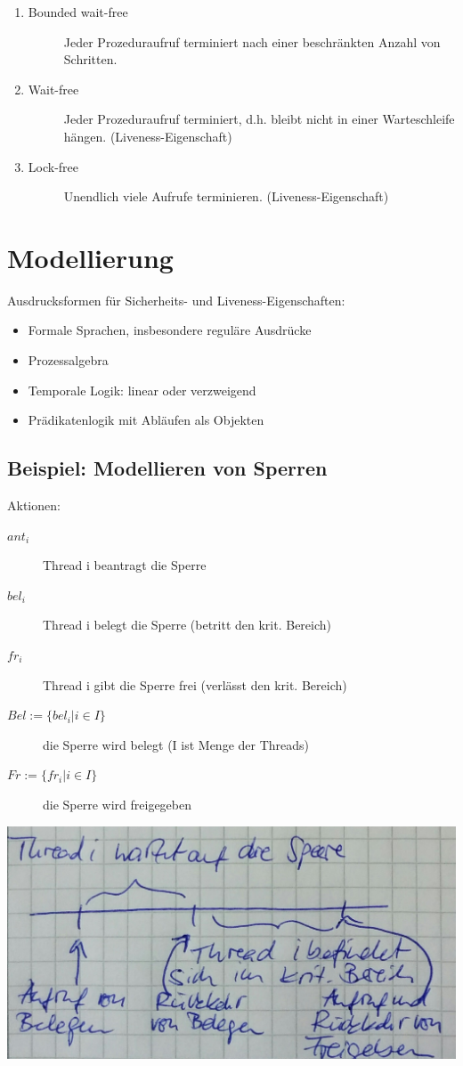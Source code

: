 \begin{enumerate}
\item
	\begin{description}
		\item [Bounded wait-free] Jeder Prozeduraufruf terminiert nach einer beschränkten Anzahl von Schritten.
	\end{description}
\item
	\begin{description}
		\item [Wait-free] Jeder Prozeduraufruf terminiert, d.h. bleibt nicht in einer Warteschleife hängen. (Liveness-Eigenschaft)
	\end{description}
\item
	\begin{description}
		\item [Lock-free] Unendlich viele Aufrufe terminieren. (Liveness-Eigenschaft)
	\end{description}
\end{enumerate}

\section{Modellierung}
Ausdrucksformen für Sicherheits- und Liveness-Eigenschaften:
\begin{itemize}
\item Formale Sprachen, insbesondere reguläre Ausdrücke
\item Prozessalgebra
\item Temporale Logik: linear oder verzweigend
\item Prädikatenlogik mit Abläufen als Objekten
\end{itemize}

\subsection*{Beispiel: Modellieren von Sperren}
Aktionen:
\begin{description}
	\item [$ant_i$] Thread i beantragt die Sperre
	\item [$bel_i$] Thread i belegt die Sperre (betritt den krit. Bereich)
	\item [$fr_i$] Thread i gibt die Sperre frei (verlässt den krit. Bereich)
	\item [$Bel:=\{bel_i | i \in I\}$] die Sperre wird belegt (I ist Menge der Threads)
	\item [$Fr:=\{fr_i | i \in I\}$] die Sperre wird freigegeben
\end{description}
\includegraphics[width=.4\textwidth]{Verifikation_Zeitstrahl4.jpeg}
\pagebreak

